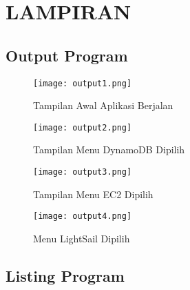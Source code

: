 \documentclass[pi.tex]{subfile}
\begin{document}
\chapter*{LAMPIRAN}
\setcounter{section}{0}
\renewcommand*{\theHsection}{chX.\the\value{section}}

\setcounter{page}{1}
\renewcommand{\thepage}{L-\arabic{page}}

\section{Output Program}

\begin{figure}[H]
    \centering
  \texttt{[image: output1.png]}
  \caption[Output Program Berjalan]{Tampilan Awal Aplikasi Berjalan}
\end{figure}

\begin{figure}[H]
    \centering
  \texttt{[image: output2.png]}
  \caption[Output Program Menu DynamoDB]{Tampilan Menu DynamoDB Dipilih}
\end{figure}

\begin{figure}[H]
    \centering
  \texttt{[image: output3.png]}
  \caption[Output Program Menu EC2]{Tampilan Menu EC2 Dipilih}
\end{figure}

\begin{figure}[H]
    \centering
  \texttt{[image: output4.png]}
  \caption[Output Program Menu LightSail]{Menu LightSail Dipilih}
  \end{figure}

\pagebreak
\section{Listing Program}
\end{document}
